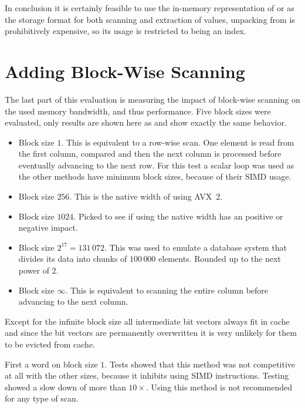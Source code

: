 In conclusion it is certainly feasible to use the in-memory representation of
\simdscan{} or \bs{} as the storage format for both scanning and extraction of
values, unpacking from \bwv{} is prohibitively expensive, so its usage is
restricted to being an index.

\section{Adding Block-Wise Scanning}

The last part of this evaluation is measuring the impact of block-wise scanning
on the used memory bandwidth, and thus performance. Five block sizes were
evaluated, only \bwv{} results are shown here as \simdscan{} and \bs{} show
exactly the same behavior.

\begin{itemize}
  \item Block size $1$. This is equivalent to a row-wise scan. One element is read
    from the first column, compared and then the next column is processed before
    eventually advancing to the next row. For this test a scalar loop was used
    as the other methods have minimum block sizes, because of their SIMD usage.
  \item Block size $256$. This is the native width of \bwv{} using AVX~2.
  \item Block size $1024$. Picked to see if using the native width has an
    positive or negative impact.
  \item Block size $2^{17}=131\,072$. This was used to emulate a database system
    that divides its data into chunks of $100\,000$ elements. Rounded up to the
    next power of 2.
  \item Block size $\infty$. This is equivalent to scanning the entire column
    before advancing to the next column.
\end{itemize}

Except for the infinite block size all intermediate bit vectors always fit in
cache and since the bit vectors are permanently overwritten it is very unlikely
for them to be evicted from cache.

First a word on block size $1$. Tests showed that this method was not
competitive at all with the other sizes, because it inhibits using SIMD
instructions. Testing showed a slow down of more than $10\times$. Using this
method is not recommended for any type of scan.

